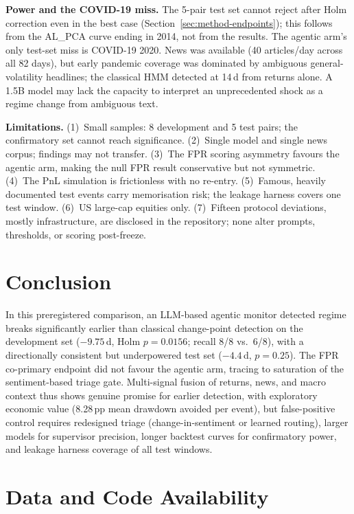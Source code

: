 \documentclass[10pt,a4paper]{article}
\begin{document}
\textbf{Power and the COVID-19 miss.} The 5-pair test set cannot reject after
Holm correction even in the best case (Section~\ref{sec:method-endpoints});
this follows from the AL\_PCA curve ending in 2014, not from the results. The
agentic arm's only test-set miss is COVID-19 2020. News was available (40
articles/day across all 82 days), but early pandemic coverage was dominated by
ambiguous general-volatility headlines; the classical HMM detected at 14\,d
from returns alone. A 1.5B model may lack the capacity to interpret an
unprecedented shock as a regime change from ambiguous text.\label{sec:power}

\textbf{Limitations.} (1)~Small samples: 8 development and 5 test pairs; the
confirmatory set cannot reach significance. (2)~Single model and single news
corpus; findings may not transfer. (3)~The FPR scoring asymmetry favours the
agentic arm, making the null FPR result conservative but not symmetric.
(4)~The PnL simulation is frictionless with no re-entry. (5)~Famous, heavily
documented test events carry memorisation risk; the leakage harness covers one
test window. (6)~US large-cap equities only. (7)~Fifteen protocol deviations,
mostly infrastructure, are disclosed in the repository; none alter prompts,
thresholds, or scoring post-freeze.

\section{Conclusion}\label{sec:conclusion}

In this preregistered comparison, an LLM-based agentic monitor detected regime
breaks significantly earlier than classical change-point detection on the
development set ($-9.75$\,d, Holm $p = 0.0156$; recall 8/8 vs.\ 6/8), with a
directionally consistent but underpowered test set ($-4.4$\,d, $p = 0.25$).
The FPR co-primary endpoint did not favour the agentic arm, tracing to
saturation of the sentiment-based triage gate. Multi-signal fusion of returns,
news, and macro context thus shows genuine promise for earlier detection, with
exploratory economic value (8.28\,pp mean drawdown avoided per event), but
false-positive control requires redesigned triage (change-in-sentiment or
learned routing), larger models for supervisor precision, longer backtest
curves for confirmatory power, and leakage harness coverage of all test
windows.

\section*{Data and Code Availability}
\end{document}
